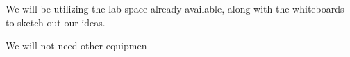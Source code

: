 We will be utilizing the lab space already available, along with the whiteboards to sketch out our ideas.

We will not need other equipmen
